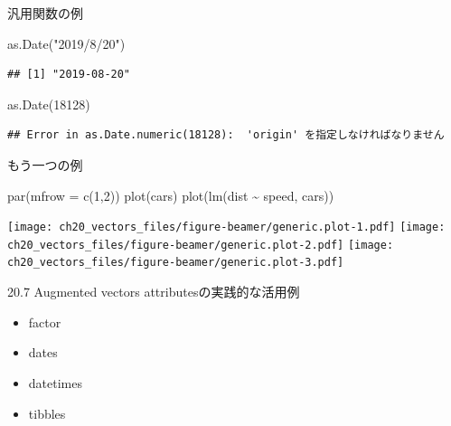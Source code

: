 \documentclass[
  ignorenonframetext,
]{beamer}
\newenvironment{Shaded}{\begin{snugshade}}{\end{snugshade}}
\newcommand{\AttributeTok}[1]{\textcolor[rgb]{0.77,0.63,0.00}{#1}}
\newcommand{\DecValTok}[1]{\textcolor[rgb]{0.00,0.00,0.81}{#1}}
\newcommand{\FunctionTok}[1]{\textcolor[rgb]{0.00,0.00,0.00}{#1}}
\newcommand{\NormalTok}[1]{#1}
\newcommand{\SpecialCharTok}[1]{\textcolor[rgb]{0.00,0.00,0.00}{#1}}
\newcommand{\StringTok}[1]{\textcolor[rgb]{0.31,0.60,0.02}{#1}}
\providecommand{\tightlist}{%
  \setlength{\itemsep}{0pt}\setlength{\parskip}{0pt}}
\begin{document}
\begin{frame}[fragile]{汎用関数の例}
\protect\hypertarget{ux6c4eux7528ux95a2ux6570ux306eux4f8b}{}
\begin{Shaded}
\begin{Highlighting}[]
\FunctionTok{as.Date}\NormalTok{(}\StringTok{"2019/8/20"}\NormalTok{)}
\end{Highlighting}
\end{Shaded}

\begin{verbatim}
## [1] "2019-08-20"
\end{verbatim}

\begin{Shaded}
\begin{Highlighting}[]
\FunctionTok{as.Date}\NormalTok{(}\DecValTok{18128}\NormalTok{)}
\end{Highlighting}
\end{Shaded}

\begin{verbatim}
## Error in as.Date.numeric(18128):  'origin' を指定しなければなりません
\end{verbatim}
\end{frame}

\begin{frame}[fragile]{もう一つの例}
\protect\hypertarget{ux3082ux3046ux4e00ux3064ux306eux4f8b}{}
\begin{Shaded}
\begin{Highlighting}[]
\FunctionTok{par}\NormalTok{(}\AttributeTok{mfrow =} \FunctionTok{c}\NormalTok{(}\DecValTok{1}\NormalTok{,}\DecValTok{2}\NormalTok{))}
\FunctionTok{plot}\NormalTok{(cars)}
\FunctionTok{plot}\NormalTok{(}\FunctionTok{lm}\NormalTok{(dist }\SpecialCharTok{\textasciitilde{}}\NormalTok{ speed, cars))}
\end{Highlighting}
\end{Shaded}

\texttt{[image: ch20\_vectors\_files/figure-beamer/generic.plot-1.pdf]}
\texttt{[image: ch20\_vectors\_files/figure-beamer/generic.plot-2.pdf]}
\texttt{[image: ch20\_vectors\_files/figure-beamer/generic.plot-3.pdf]}
\end{frame}

\begin{frame}{20.7 Augmented vectors}
\protect\hypertarget{augmented-vectors}{}
attributesの実践的な活用例

\begin{itemize}
\tightlist
\item
  factor
\item
  dates
\item
  datetimes
\item
  tibbles
\end{itemize}
\end{frame}
\end{document}
